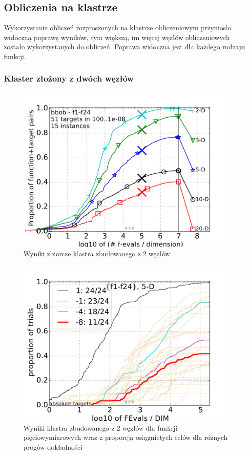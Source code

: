 \documentclass[12pt, twoside, openany, abstract=on]{report}
\theoremstyle{definition}
\begin{document}
\subsection{Obliczenia na klastrze}
Wykorzystanie obliczeń rozproszonych na klastrze obliczeniowym przyniosło widoczną poprawę wyników, tym większą, im więcej węzłów obliczeniowych zostało wykorzystanych do obliczeń. Poprawa widoczna jest dla każdego rodzaju funkcji.

\subsubsection{Klaster złożony z dwóch węzłów}

\begin{figure}[H]
    \includegraphics[scale=1]{charts/2nodes.pdf} 
 \caption{Wyniki zbiorcze klastra zbudowanego z 2 węzłów}
\end{figure}

\begin{figure}[H]
    \includegraphics[scale=1]{charts/2nodes_5D.pdf} 
 \caption{Wyniki klastra zbudowanego z 2 węzłów dla funkcji pięciowymiarowych wraz z proporcją osiągniętych celów dla różnych progów dokładności}
\end{figure}
\end{document}
